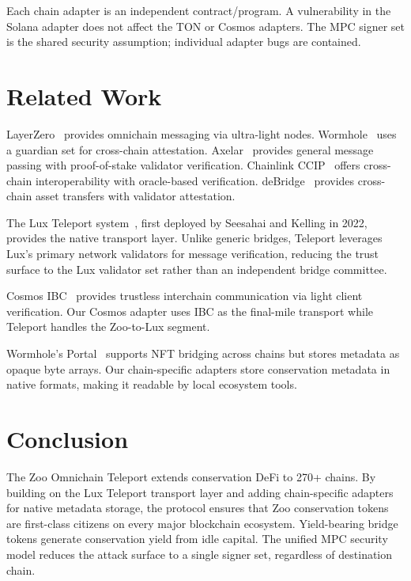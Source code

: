 \documentclass[11pt,letterpaper]{article}
\begin{document}
Each chain adapter is an independent contract/program. A vulnerability in the Solana adapter does not affect the TON or Cosmos adapters. The MPC signer set is the shared security assumption; individual adapter bugs are contained.

\section{Related Work}

LayerZero~\cite{layerzero2022} provides omnichain messaging via ultra-light nodes. Wormhole~\cite{wormhole2022} uses a guardian set for cross-chain attestation. Axelar~\cite{axelar2022} provides general message passing with proof-of-stake validator verification. Chainlink CCIP~\cite{ccip2023} offers cross-chain interoperability with oracle-based verification. deBridge~\cite{debridge2023} provides cross-chain asset transfers with validator attestation.

The Lux Teleport system~\cite{teleport2022}, first deployed by Seesahai and Kelling in 2022, provides the native transport layer. Unlike generic bridges, Teleport leverages Lux's primary network validators for message verification, reducing the trust surface to the Lux validator set rather than an independent bridge committee.

Cosmos IBC~\cite{ibc2019} provides trustless interchain communication via light client verification. Our Cosmos adapter uses IBC as the final-mile transport while Teleport handles the Zoo-to-Lux segment.

Wormhole's Portal~\cite{portal2022} supports NFT bridging across chains but stores metadata as opaque byte arrays. Our chain-specific adapters store conservation metadata in native formats, making it readable by local ecosystem tools.

\section{Conclusion}

The Zoo Omnichain Teleport extends conservation DeFi to 270+ chains. By building on the Lux Teleport transport layer and adding chain-specific adapters for native metadata storage, the protocol ensures that Zoo conservation tokens are first-class citizens on every major blockchain ecosystem. Yield-bearing bridge tokens generate conservation yield from idle capital. The unified MPC security model reduces the attack surface to a single signer set, regardless of destination chain.
\end{document}
